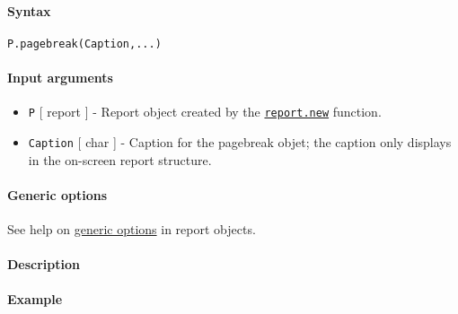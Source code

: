 


	\paragraph{Syntax}\label{syntax}

\begin{verbatim}
P.pagebreak(Caption,...)
\end{verbatim}

\paragraph{Input arguments}\label{input-arguments}

\begin{itemize}
\item
  \texttt{P} {[} report {]} - Report object created by the
  \href{report/new}{\texttt{report.new}} function.
\item
  \texttt{Caption} {[} char {]} - Caption for the pagebreak objet; the
  caption only displays in the on-screen report structure.
\end{itemize}

\paragraph{Generic options}\label{generic-options}

See help on \href{report/Contents}{generic options} in report objects.

\paragraph{Description}\label{description}

\paragraph{Example}\label{example}


